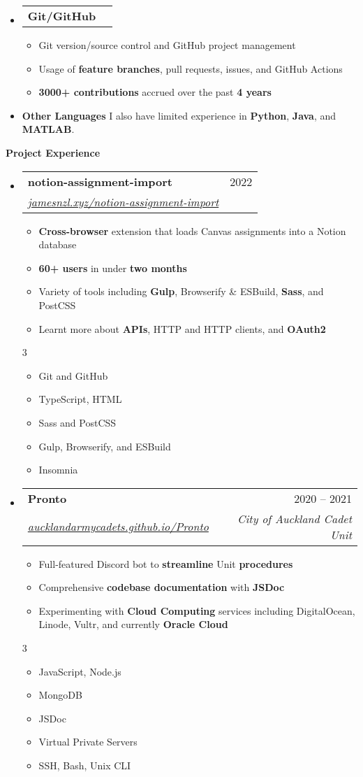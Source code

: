 \documentclass[11pt,a4paper]{article}[leftmargin=*]
\makeatletter
\def \entryspacing {-0pt}
\renewcommand{\section}[2]{\vspace{5pt}
  \colorbox{secondary}{\color{white}\raggedbottom\normalsize\textbf{{#1}{\hspace{2pt}#2}}}
}
\newcommand{\resumeEntryStart}{\begin{itemize}[leftmargin=2.5mm]}
\newcommand{\resumeEntryEnd}{\end{itemize}\vspace{\entryspacing}}
\newcommand{\resumeItemListStart}{\begin{itemize}[leftmargin=4.5mm]}
\newcommand{\resumeItemListEnd}{\end{itemize}}
\newcommand{\resumeItemListStartColumns}[2][-0.5]{\vspace*{#1\multicolsep}
\begin{multicols}{#2}\begin{itemize}[leftmargin=4.5mm]}
\newcommand{\resumeItemListEndColumns}[1][-0.5]{\end{itemize}\end{multicols}\vspace*{#1\multicolsep}}
\newcommand{\resumeItem}[1]{
  \item\small{
    {#1 \vspace{-2pt}}
  }
}
\newcommand{\resumeEntryTSDL}[4]{
  \vspace{-1pt}\item[]
    \begin{tabularx}{0.97\textwidth}{X@{\hspace{60pt}}r}
      \textbf{\color{primary}#1} & {\firabook\color{accent}\small#2} \\
      \textit{\color{accent}\small#3} & \textit{\color{accent}\small#4} \\
    \end{tabularx}\vspace{-6pt}
}
\newcommand{\resumeEntryTD}[2]{
  \vspace{-1pt}\item[]
    \begin{tabularx}{0.97\textwidth}{X@{\hspace{60pt}}r}
      \textbf{\color{primary}#1} & {\firabook\color{accent}\small#2} \\
    \end{tabularx}\vspace{-6pt}
}
\newcommand{\resumeEntryS}[2]{
  \item[]\small{
    \textbf{\color{primary}#1 }{ #2 \vspace{-4pt}}
  }
}
\newcommand{\resumeBf}[1]{\small\textbf{\color{halfbold}#1}}
\makeatother
\begin{document}
\resumeEntryStart
\resumeEntryTD
{Git/GitHub}{}
\resumeItemListStart
\resumeItem {Git version/source control and GitHub project management}
\resumeItem {Usage of \resumeBf{feature branches}, pull requests, issues, and GitHub Actions}
\resumeItem {\resumeBf{3000+ contributions} accrued over the past \resumeBf{4 years}}
\resumeItemListEnd
\resumeEntryEnd

\resumeEntryStart
\resumeEntryS
{Other Languages}{I also have limited experience in \resumeBf{Python}, \resumeBf{Java}, and \resumeBf{MATLAB}.}
\resumeEntryEnd

\pagebreak


\section{\faFlask}{Project Experience}

\resumeEntryStart
\resumeEntryTSDL
{notion-assignment-import}{2022}
{\href{https://jamesnzl.xyz/notion-assignment-import}{jamesnzl.xyz/notion-assignment-import}}{}
\resumeItemListStart
\resumeItem {\resumeBf{Cross-browser} extension that loads Canvas assignments into a Notion database}
\resumeItem {\resumeBf{60+ users} in under \resumeBf{two months}}
\resumeItem {Variety of tools including \resumeBf{Gulp}, Browserify \& ESBuild, \resumeBf{Sass}, and PostCSS}
\resumeItem {Learnt more about \resumeBf{APIs}, HTTP and HTTP clients, and \resumeBf{OAuth2}}
\resumeItemListEnd
\resumeItemListStartColumns{3}
\resumeItem {Git and GitHub}
\resumeItem {TypeScript, HTML}
\resumeItem {Sass and PostCSS}
\resumeItem {Gulp, Browserify, and ESBuild}
\resumeItem {Insomnia}
\resumeItemListEndColumns
\resumeEntryEnd

\resumeEntryStart
\resumeEntryTSDL
{Pronto}{2020 -- 2021}
{\href{https://aucklandarmycadets.github.io/Pronto/}{aucklandarmycadets.github.io/Pronto}}{City of Auckland Cadet Unit}
\resumeItemListStart
\resumeItem {Full-featured Discord bot to \resumeBf{streamline} Unit \resumeBf{procedures}}
\resumeItem {Comprehensive \resumeBf{codebase documentation} with \resumeBf{JSDoc}}
\resumeItem {Experimenting with \resumeBf{Cloud Computing} services including DigitalOcean, Linode, Vultr, and currently \resumeBf{Oracle Cloud}}
\resumeItemListEnd
\resumeItemListStartColumns{3}
\resumeItem {JavaScript, Node.js}
\resumeItem {MongoDB}
\resumeItem {JSDoc}
\resumeItem {Virtual Private Servers}
\resumeItem {SSH, Bash, Unix CLI}
\resumeItemListEndColumns
\resumeEntryEnd
\end{document}
